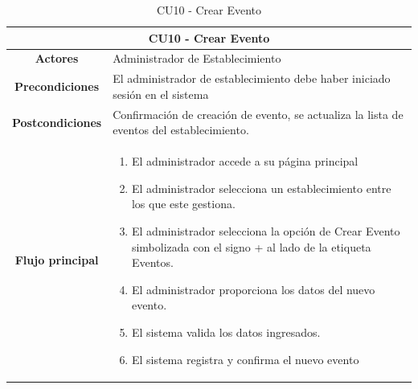 \begin{table}[h]
    \centering
    \begin{tabular}{|c|p{10cm}|}
        \hline
        \multicolumn{2}{|c|}{\textbf{CU10 - Crear Evento}}                                                                                               \\
        \hline
        \textbf{Actores}         & Administrador de Establecimiento                                                                                      \\
        \hline
        \textbf{Precondiciones}  & El administrador de establecimiento debe haber iniciado sesión en el sistema                                          \\
        \hline
        \textbf{Postcondiciones} & Confirmación de creación de evento, se actualiza la lista de eventos del establecimiento.                             \\
        \hline
        \textbf{Flujo principal} & \begin{enumerate}
                                       \item El administrador accede a su página principal
                                       \item El administrador selecciona un establecimiento entre los que este gestiona.
                                       \item El administrador selecciona la opción de Crear Evento simbolizada con el signo + al lado de la etiqueta Eventos.
                                       \item El administrador proporciona los datos del nuevo evento.
                                       \item El sistema valida los datos ingresados.
                                       \item El sistema registra y confirma el nuevo evento
                                   \end{enumerate} \\
        \hline
    \end{tabular}
    \caption{CU10 - Crear Evento }
\end{table}

